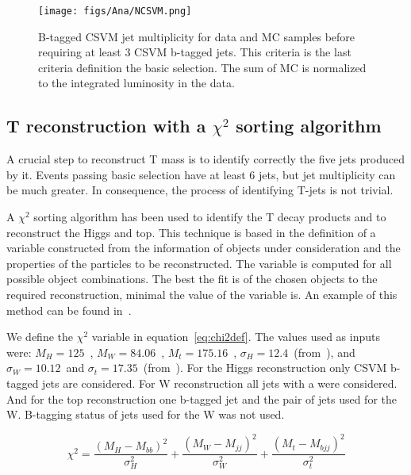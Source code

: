 \begin{figure}[!Hhtbp]
  \begin{center}
    \texttt{[image: figs/Ana/NCSVM.png]}
    \caption{B-tagged CSVM jet multiplicity for data and MC samples before requiring at least 3 CSVM b-tagged jets. This criteria is the last criteria definition the basic selection. The sum of MC is normalized to the integrated luminosity in the data.}
    \label{fig:Nb}
  \end{center}
\end{figure}

\subsection{T reconstruction with a $\chi^{2}$ sorting algorithm}
\label{sec:chi2}

A crucial step to reconstruct T mass is to identify correctly the five jets produced by it. Events passing basic selection have at least 6 jets, but jet multiplicity can be much greater. In consequence, the process of identifying T-jets is not trivial. 

A $\chi^{2}$ sorting algorithm has been used to identify the T decay products and to reconstruct the Higgs and top. This technique is based in the definition of a variable constructed from the information of objects under consideration and the properties of the particles to be reconstructed. The variable is computed for all possible object combinations. The best the fit is of the chosen objects to the required reconstruction, minimal the value of the variable is. An example of this method can be found in~\cite{Brochet:1956723}. 

We define the $\chi^{2}$ variable in equation~\ref{eq:chi2def}. The values used as inputs were: $M_{H}=125$~\GeVcc, $M_{W}=84.06$~\GeVcc, $M_{t}=175.16$~\GeVcc, $\sigma_{H}=12.4$~\GeVcc (from~\cite{Chatrchyan:2013zna}), and $\sigma_{W}=10.12$~\GeVcc and $\sigma_{t}=17.35$~\GeVcc (from~\cite{Brochet:1956723}). For the Higgs reconstruction only CSVM b-tagged jets are considered. For W reconstruction all jets with a  were considered. And for the top reconstruction one b-tagged jet and the pair of jets used for the W. B-tagging status of jets used for the W was not used.

\begin{equation}
\chi^{2}=\frac{(M_{H}-M_{bb})^{2}}{\sigma_{H}^{2}}+\frac{(M_{W}-M_{jj})^{2}}{\sigma_{W}^{2}}+\frac{(M_{t}-M_{bjj})^{2}}{\sigma_{t}^{2}}
\label{eq:chi2def}
\end{equation}

